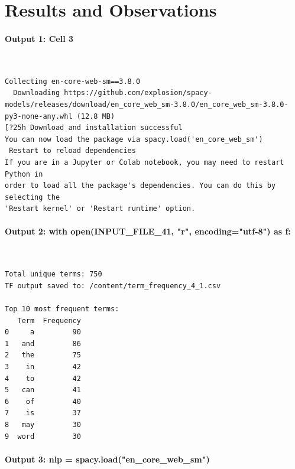 \documentclass[12pt,a4paper,oneside]{report}
\begin{document}
\section{Results and Observations}
\paragraph{Output 1: Cell 3}\mbox{}\\[-1ex]
\begin{Verbatim}[commandchars=\\\{\},breaklines=true,breakanywhere=true,fontsize=\scriptsize,frame=leftline,framesep=2mm,rulecolor=\color{gray}]
Collecting en-core-web-sm==3.8.0
  Downloading https://github.com/explosion/spacy-models/releases/download/en_core_web_sm-3.8.0/en_core_web_sm-3.8.0-py3-none-any.whl (12.8 MB)
[?25h Download and installation successful
You can now load the package via spacy.load('en_core_web_sm')
 Restart to reload dependencies
If you are in a Jupyter or Colab notebook, you may need to restart Python in
order to load all the package's dependencies. You can do this by selecting the
'Restart kernel' or 'Restart runtime' option.
\end{Verbatim}
\paragraph{Output 2: with open(INPUT\_FILE\_41, "r", encoding="utf-8") as f:}\mbox{}\\[-1ex]
\begin{Verbatim}[commandchars=\\\{\},breaklines=true,breakanywhere=true,fontsize=\scriptsize,frame=leftline,framesep=2mm,rulecolor=\color{gray}]
Total unique terms: 750
TF output saved to: /content/term_frequency_4_1.csv

Top 10 most frequent terms:
   Term  Frequency
0     a         90
1   and         86
2   the         75
3    in         42
4    to         42
5   can         41
6    of         40
7    is         37
8   may         30
9  word         30
\end{Verbatim}
\paragraph{Output 3: nlp = spacy.load("en\_core\_web\_sm")}\mbox{}\\[-1ex]
\end{document}

